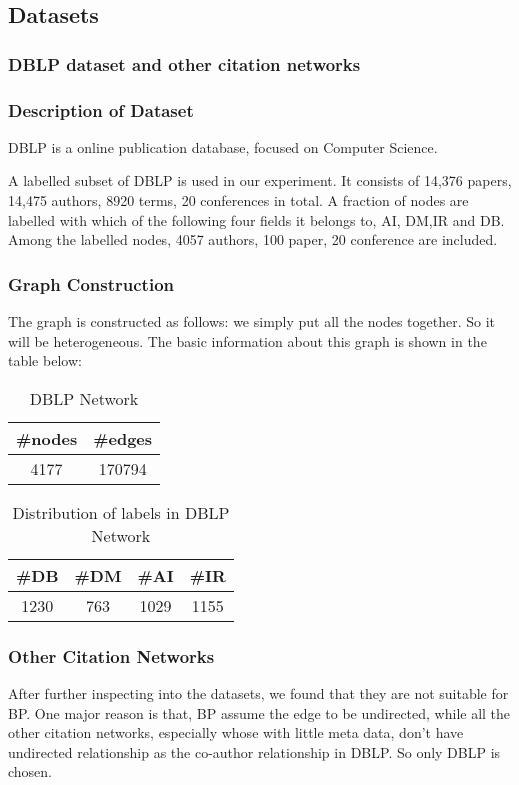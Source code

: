 \subsection{Datasets}
\subsubsection{DBLP dataset and other citation networks}
\subsubsection*{Description of Dataset}
DBLP is a online publication database, focused on Computer Science. 

A labelled subset of DBLP is used in our experiment. It consists of 14,376 papers, 14,475 authors, 8920 terms, 20 conferences in total. A fraction of nodes are labelled with which of the following four fields it belongs to, AI, DM,IR and DB. Among the labelled nodes, 4057 authors, 100 paper, 20 conference are included.
\subsubsection*{Graph Construction}
The graph is constructed as follows: we simply put all the nodes together. So it will be heterogeneous. The basic information about this graph is shown in the table below:

\begin{table}[!ht]
\centering
\begin{tabular}{cc}
\toprule
\textbf{\#nodes} & \textbf{\#edges}\\
\midrule
4177 & 170794\\
\bottomrule
\end{tabular}
\caption{DBLP Network}
\end{table}

\begin{table}[!ht]
\centering
\begin{tabular}{cccc}
\toprule
\textbf{\#DB} & \textbf{\#DM} & \textbf{\#AI} & \textbf{\#IR}\\
\midrule
1230 & 763 & 1029 & 1155\\
\bottomrule
\end{tabular}
\caption{Distribution of labels in DBLP Network}
\end{table}





\subsubsection*{Other Citation Networks}
After further inspecting into the datasets, we found that they are not suitable for BP. One major reason is that, BP assume the edge to be undirected, while all the other citation networks, especially whose with little meta data, don't have undirected relationship as the co-author relationship in DBLP. So only DBLP is chosen.

